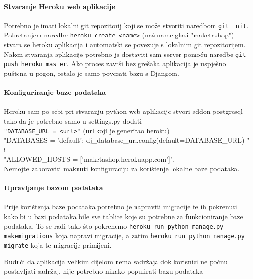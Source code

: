 {			\\
			\textbf{Stvaranje Heroku web aplikacije}\\
			\\
			Potrebno je imati lokalni git repozitorij koji se može stvoriti naredbom
			\verb|git init|.
			Pokretanjem naredbe 
			\verb|heroku create <name>| (naš name glasi "maketashop")
			stvara se heroku aplikacija i automatski se povezuje s lokalnim git repozitorijem.
			Nakon stvaranja aplikacije potrebno je dostaviti sam server pomoću naredbe \verb|git push heroku master|. Ako proces završi bez grešaka aplikacija je uspješno puštena u pogon, ostalo je samo povezati bazu s Djangom.
			\\
			\\
			\textbf{Konfiguriranje baze podataka}\\
			\\
			Heroku sam po sebi pri stvaranju python web aplikacije stvori addon
			postgresql tako da je potrebno samo u settings.py dodati \\
			\verb|"DATABASE_URL = <url>"| (url koji je generirao heroku) \\
			"DATABASES = {
				'default': dj\_database\_url.config(default=DATABASE\_URL)
			}"
			i \\
			"ALLOWED\_HOSTS = ['maketashop.herokuapp.com']". \\
			Nemojte zaboraviti maknuti konfiguraciju za korištenje lokalne baze podataka.\\
			\\
			\textbf{Upravljanje bazom podataka}\\
			\\
			Prije korištenja baze podataka potrebno je napraviti migracije te ih pokrenuti kako bi u bazi podataka bile sve tablice koje su potrebne za funkcioniranje baze podataka. To se radi tako što pokrenemo \verb|heroku run python manage.py makemigrations| koja napravi migracije, a zatim \verb|heroku run python manage.py migrate| koja te migracije primijeni.
			
			Budući da aplikacija velikim dijelom nema sadržaja dok korisnici ne počnu postavljati sadržaj, nije potrebno nikako populirati bazu podataka
			
}
